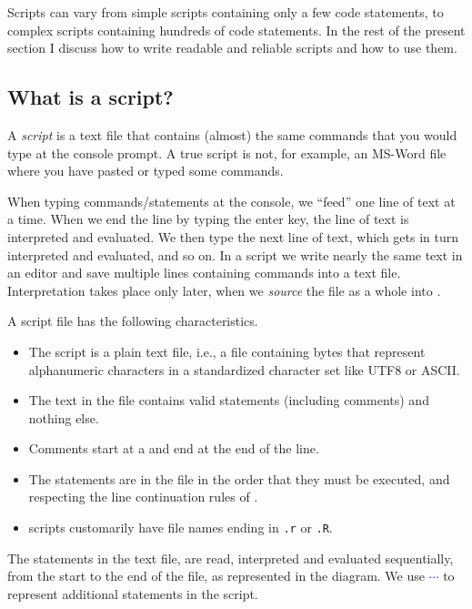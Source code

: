 \begin{playground}
Scripts can vary from simple scripts containing only a few code statements, to complex scripts containing hundreds of code statements. In the rest of the present section I discuss how to write readable and reliable scripts and how to use them.

\subsection{What is a script?}\label{sec:script:what:is}
A \textit{script} is a text file that contains (almost) the same commands that you would type at the \Rlang console prompt. A true script is not, for example, an MS-Word file where you have pasted or typed some \Rlang commands.

When typing commands/statements at the \Rlang console, we ``feed'' one line of text at a time. When we end the line by typing the enter key, the line of text is interpreted and evaluated. We then type the next line of text, which gets in turn interpreted and evaluated, and so on. In a script we write nearly the same text in an editor and save multiple lines containing commands into a text file. Interpretation takes place only later, when we \emph{source} the file as a whole into \Rlang.

A script file has the following characteristics.
\begin{itemize}
  \item The script is a plain text file, i.e., a file containing bytes that represent alphanumeric characters in a standardized character set like UTF8 or ASCII.
  \item The text in the file contains valid \Rlang statements (including comments) and nothing else.
  \item Comments start at a \code{\#} and end at the end of the line.
  \item The \Rlang statements are in the file in the order that they must be executed, and respecting the line continuation rules of \Rlang.
  \item \Rlang scripts customarily have file names ending in \texttt{.r} or \texttt{.R}.
\end{itemize}

The statements in the text file, are read, interpreted and evaluated sequentially, from the start to the end of the file, as represented in the diagram. We use \textcolor{blue}{$\cdots$} to represent additional statements in the script.


\end{playground}
